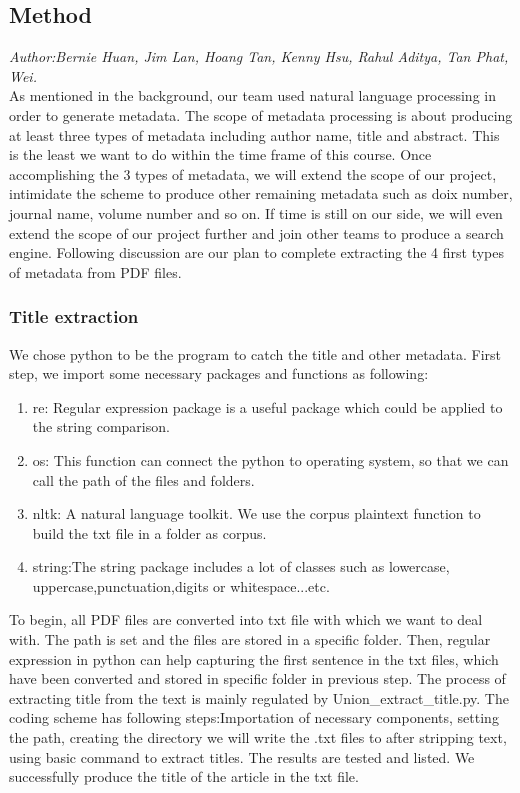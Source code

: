 \subsection{Method} %
\textit{\footnotesize Author:Bernie Huan, Jim Lan, Hoang Tan, Kenny Hsu, Rahul Aditya, Tan Phat, Wei.}\\

As mentioned in the background, our team used natural language processing in order to generate metadata. 
The scope of metadata processing is about producing at least three types of metadata including author name, title and abstract.
This is the least we want to do within the time frame of this course.
Once accomplishing the 3 types of metadata, we will extend the scope of our project, intimidate the scheme to produce other remaining metadata such as doix number, journal name, volume number and so on.
If time is still on our side, we will even extend the scope of our project further and join other teams to produce a search engine.
Following discussion are our plan to complete extracting the 4 first types of metadata from PDF files.

\subsubsection{Title extraction}

We chose python to be the program to catch the title and other metadata.
First step, we import some necessary packages and functions as following:

\begin{enumerate}
	
	\item re: Regular expression package is a useful package which could be applied to the string comparison.
	\item os: This function can connect the python to operating system, so that we can call the path of the files and folders.
	\item nltk: A natural language toolkit.	We use the corpus plaintext function to build the txt file in a folder as corpus.
	\item string:The string package includes a lot of classes such as lowercase, uppercase,punctuation,digits or whitespace...etc.
	
\end{enumerate}  

To begin, all PDF files are converted into txt file with which we want to deal with.
The path is set and the files are stored in a specific folder.
Then, regular expression in python can help capturing the first sentence in the txt files, which have been converted and stored in specific folder in previous step.
The process of extracting title from the text is mainly regulated by Union\_extract\_title.py.
The coding scheme has following steps:Importation of necessary components, setting the path, creating the directory we will write the .txt files to after stripping text, using basic command to extract titles.
The results are tested and listed.
We successfully produce the title of the article in the txt file. 

